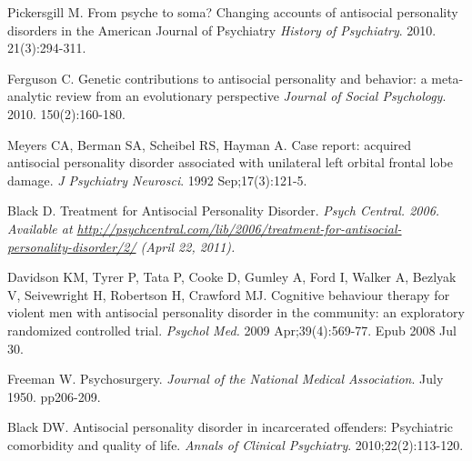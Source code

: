  

\begin{thebibliography}{99}


 Pickersgill M. From psyche to soma? Changing accounts of antisocial personality disorders in the American Journal of Psychiatry {\it History of Psychiatry}. 2010. 21(3):294-311.

 Ferguson C. Genetic contributions to antisocial personality and behavior: a meta-analytic review from an evolutionary perspective {\it Journal of Social Psychology}. 2010. 150(2):160-180.

 Meyers CA, Berman SA, Scheibel RS, Hayman A. Case report: acquired antisocial personality disorder associated with unilateral left orbital frontal lobe damage. {\it J Psychiatry Neurosci}. 1992 Sep;17(3):121-5.

 Black D. Treatment for Antisocial Personality Disorder. \it{Psych Central}. 2006. Available at \url{http://psychcentral.com/lib/2006/treatment-for-antisocial-personality-disorder/2/} (April 22, 2011).


 Davidson KM, Tyrer P, Tata P, Cooke D, Gumley A, Ford I, Walker A, Bezlyak V, Seivewright H, Robertson H, Crawford MJ. Cognitive behaviour therapy for violent men with antisocial personality disorder in the community: an exploratory randomized controlled trial. {\it Psychol Med.} 2009 Apr;39(4):569-77. Epub 2008 Jul 30.

 Freeman W. Psychosurgery. {\it Journal of the National Medical Association}. July 1950. pp206-209.

 Black DW. Antisocial personality disorder in incarcerated offenders: Psychiatric comorbidity and quality of life. {\it Annals of Clinical Psychiatry}. 2010;22(2):113-120.



\end{thebibliography}
